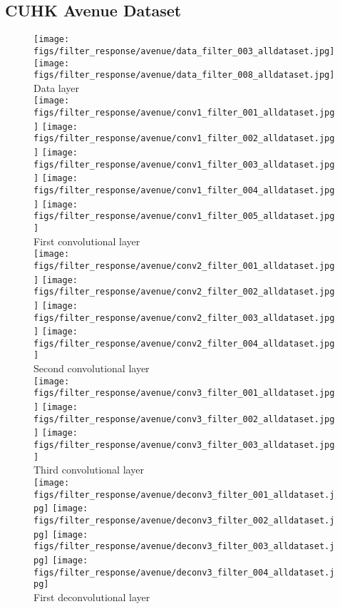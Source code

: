 \documentclass[10pt,twocolumn,letterpaper]{article}
\begin{document}
\subsection{CUHK Avenue Dataset}
\label{sec:filter_res_vis_avenue}

\begin{figure}[h]
	\centering
	\texttt{[image: figs/filter\_response/avenue/data\_filter\_003\_alldataset.jpg]}
	\texttt{[image: figs/filter\_response/avenue/data\_filter\_008\_alldataset.jpg]}\\
	{\footnotesize Data layer}\\
	\texttt{[image: figs/filter\_response/avenue/conv1\_filter\_001\_alldataset.jpg]}
	\texttt{[image: figs/filter\_response/avenue/conv1\_filter\_002\_alldataset.jpg]}
	\texttt{[image: figs/filter\_response/avenue/conv1\_filter\_003\_alldataset.jpg]}
	\texttt{[image: figs/filter\_response/avenue/conv1\_filter\_004\_alldataset.jpg]}
	\texttt{[image: figs/filter\_response/avenue/conv1\_filter\_005\_alldataset.jpg]}\\
	{\footnotesize First convolutional layer}\\
	\texttt{[image: figs/filter\_response/avenue/conv2\_filter\_001\_alldataset.jpg]}
	\texttt{[image: figs/filter\_response/avenue/conv2\_filter\_002\_alldataset.jpg]}
	\texttt{[image: figs/filter\_response/avenue/conv2\_filter\_003\_alldataset.jpg]}
	\texttt{[image: figs/filter\_response/avenue/conv2\_filter\_004\_alldataset.jpg]}\\
	{\footnotesize Second convolutional layer}\\
	\texttt{[image: figs/filter\_response/avenue/conv3\_filter\_001\_alldataset.jpg]}
	\texttt{[image: figs/filter\_response/avenue/conv3\_filter\_002\_alldataset.jpg]}
	\texttt{[image: figs/filter\_response/avenue/conv3\_filter\_003\_alldataset.jpg]}\\
	{\footnotesize Third convolutional layer}\\
	\texttt{[image: figs/filter\_response/avenue/deconv3\_filter\_001\_alldataset.jpg]}
	\texttt{[image: figs/filter\_response/avenue/deconv3\_filter\_002\_alldataset.jpg]}
	\texttt{[image: figs/filter\_response/avenue/deconv3\_filter\_003\_alldataset.jpg]}
	\texttt{[image: figs/filter\_response/avenue/deconv3\_filter\_004\_alldataset.jpg]}\\
	{\footnotesize First deconvolutional layer}\\

\end{figure}
\end{document}
